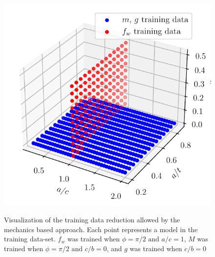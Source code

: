 \begin{figure}
    \centering
    \includegraphics[width=\textwidth]{Figures_pdf/training_slices.pdf}
    \label{fig:training_models_3d}
    \caption{Visualization of the training data reduction allowed by the mechanics based approach. Each point represents a model in the training data-set. $f_w$ was trained when $\phi = \pi/2 \text{ and } a/c = 1$, $M$ was trained when $\phi=\pi/2 \text{ and } c/b = 0$, and $g$ was trained when $c/b = 0$ }
\end{figure}



